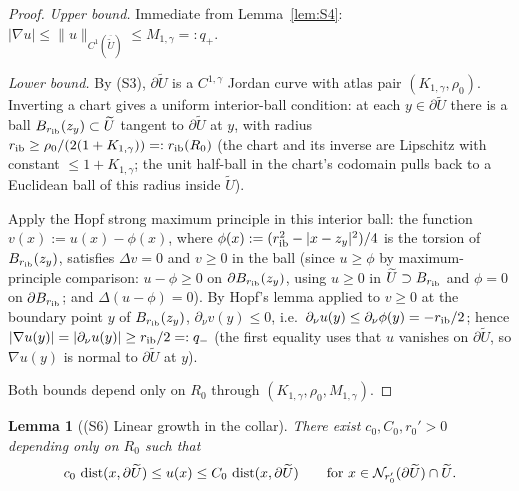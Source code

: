 \documentclass[11pt]{amsart}
\newtheorem{lemma}[theorem]{Lemma}
\newcommand{\wt}{\widetilde}
\DeclareMathOperator{\dist}{dist}
\begin{document}
\begin{proof}
\emph{Upper bound.}  Immediate from Lemma~\ref{lem:S4}:
$|\nabla u|\le\|u\|_{C^{1}(\overline{\wt U})}\le M_{1,\gamma}=:q_+$.

\emph{Lower bound.}  By (S3), $\partial\wt U$ is a $C^{1,\gamma}$
Jordan curve with atlas pair $(K_{1,\gamma},\rho_0)$.  Inverting a
chart gives a uniform interior-ball condition: at each $y\in\partial
\wt U$ there is a ball $B_{r_{\rm ib}}(z_y)\subset\wt U$ tangent to
$\partial\wt U$ at $y$, with radius $r_{\rm ib}\ge\rho_0/(2(1+
K_{1,\gamma}))=:r_{\rm ib}(R_0)$ (the chart and its inverse are
Lipschitz with constant $\le 1+K_{1,\gamma}$; the unit half-ball in
the chart's codomain pulls back to a Euclidean ball of this radius
inside $\wt U$).

Apply the Hopf strong maximum principle in this interior ball: the
function $v(x):=u(x)-\phi(x)$, where
$\phi(x):=(r_{\rm ib}^2-|x-z_y|^2)/4$ is the torsion of
$B_{r_{\rm ib}}(z_y)$, satisfies $\Delta v=0$ and $v\ge 0$ in the
ball (since $u\ge\phi$ by maximum-principle comparison: $u-\phi\ge 0$
on $\partial B_{r_{\rm ib}}(z_y)$, using $u\ge 0$ in $\wt U\supset
B_{r_{\rm ib}}$ and $\phi=0$ on $\partial B_{r_{\rm ib}}$; and
$\Delta(u-\phi)=0$).  By Hopf's lemma applied to $v\ge 0$ at the
boundary point $y$ of $B_{r_{\rm ib}}(z_y)$, $\partial_\nu v(y)\le
0$, i.e.\ $\partial_\nu u(y)\le\partial_\nu\phi(y)=-r_{\rm ib}/2$;
hence $|\nabla u(y)|=|\partial_\nu u(y)|\ge r_{\rm ib}/2=:q_-$
(the first equality uses that $u$ vanishes on $\partial\wt U$, so
$\nabla u(y)$ is normal to $\partial\wt U$ at $y$).

Both bounds depend only on $R_0$ through $(K_{1,\gamma},\rho_0,
M_{1,\gamma})$.
\end{proof}

\begin{lemma}[(S6) Linear growth in the collar]\label{lem:S6}
There exist \(c_0,C_0,r_0'>0\) depending only on \(R_0\) such that
\[
   c_0\,\dist(x,\partial\wt U)\le u(x)\le C_0\,\dist(x,\partial\wt U)
   \qquad\hbox{for }x\in\mathcal N_{r_0'}(\partial\wt U)\cap\wt U.
\]
\end{lemma}
\end{document}
